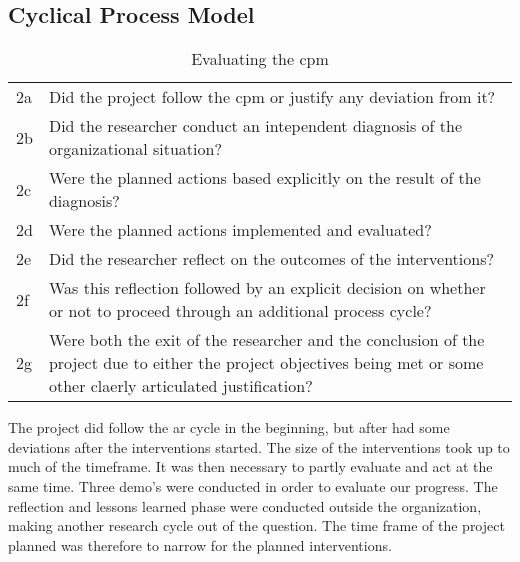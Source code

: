 \subsection{Cyclical Process Model}
\begin{table}
\centering 
\begin{tabular}{p{2cm} p{8cm}}
\hline
2a & Did the project follow the \gls{cpm} or justify any deviation from it? \\
2b & Did the researcher conduct an intependent diagnosis of the organizational situation? \\
2c & Were the planned actions based explicitly on the result of the diagnosis? \\
2d & Were the planned actions implemented and evaluated? \\
2e & Did the researcher reflect on the outcomes of the interventions? \\
2f & Was this reflection followed by an explicit decision on whether or not to proceed through an additional process cycle? \\
2g & Were both the exit of the researcher and the conclusion of the project due to either the project objectives being met or some other claerly articulated justification? \\
\hline
\end{tabular}
\caption{Evaluating the \gls{cpm}}
\label{tab:evacpm}
\end{table}
The project did follow the \gls{ar} cycle in the beginning, but after had some deviations after the interventions started.
The size of the interventions took up to much of the timeframe. 
It was then necessary to partly evaluate and act at the same time. Three demo's were conducted in order to evaluate our progress. 
The reflection and lessons learned phase were conducted outside the organization, making another research cycle out of the question.
The time frame of the project planned was therefore to narrow for the planned interventions. 

